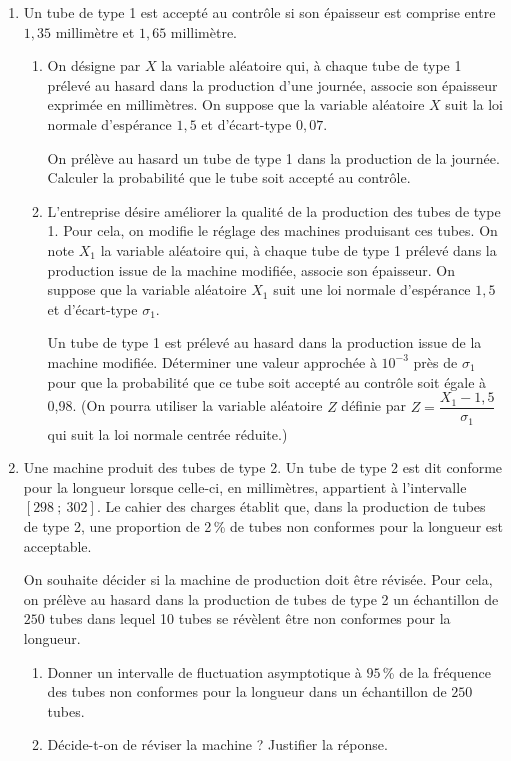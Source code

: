 \documentclass[10pt]{article}
\begin{document}
\begin{enumerate}
	\item Un tube de type 1 est accepté au contrôle si son épaisseur est comprise entre $1,35$ millimètre et $1,65$ millimètre.
	\begin{enumerate}
		\item On désigne par $X$ la variable aléatoire qui, à chaque tube de type 1 prélevé au hasard dans la production d'une journée, associe son épaisseur exprimée en millimètres. On suppose que la variable aléatoire $X$ suit la loi normale d'espérance $1,5$ et d'écart-type $0,07$.
		
\smallskip
		
On prélève au hasard un tube de type 1 dans la production de la journée. Calculer la probabilité que le tube soit accepté au contrôle.		
		\item L'entreprise désire améliorer la qualité de la production des tubes de type 1. Pour cela, on modifie le réglage des machines produisant ces tubes. On note $X_1$ la variable aléatoire qui, à chaque tube de type 1 prélevé dans la production issue de la machine modifiée, associe son épaisseur. On suppose que la variable aléatoire $X_1$ suit une loi normale d'espérance $1,5$ et d'écart-type $\sigma_1$.
		
\smallskip
		
Un tube de type 1 est prélevé au hasard dans la production issue de la machine modifiée. Déterminer une valeur approchée à $10^{-3}$ près de $\sigma_1$ pour que la probabilité que ce tube soit accepté au contrôle soit égale à 0,98. (On pourra utiliser la variable aléatoire $Z$ définie par $Z = \dfrac{X_1 - 1,5}{\sigma_1}$ qui suit la loi normale centrée réduite.)
	\end{enumerate}
\item Une machine produit des tubes de type 2. Un tube de type 2 est dit \og{}conforme pour la longueur \fg{} lorsque celle-ci, en millimètres, appartient à l’intervalle $[298~;~302]$. Le cahier des charges établit que, dans la production de tubes de type 2, une proportion de 2\,\% de tubes non \og{} conformes pour la longueur\fg{} est acceptable.
	
\smallskip
	
On souhaite décider si la machine de production doit être révisée. Pour cela, on prélève au hasard dans la production de tubes de type 2 un échantillon de $250$ tubes dans lequel 10 tubes se révèlent être non \og{}conformes pour la longueur\fg{}.	
	\begin{enumerate}
		\item Donner un intervalle de fluctuation asymptotique à $95$\,\% de la fréquence des tubes non \og{}conformes pour la longueur\fg{} dans un échantillon de $250$ tubes.		
		\item Décide-t-on de réviser la machine ? Justifier la réponse.
	\end{enumerate}
\end{enumerate}
\end{document}
